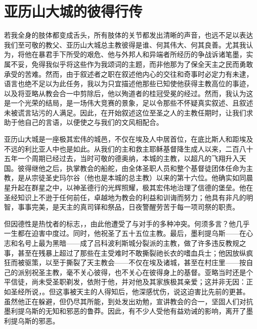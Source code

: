 
\chapter{亚历山大城的彼得行传}


若我全身的肢体都变成舌头，所有肢体的关节都发出清晰的声音，也远不足以表达我们至可敬的教父、亚历山大城总主教彼得是谁、何其伟大、何其良善。尤其我认为，将他在暴君手下所受的艰危、他与外邦人和异端者所经历的争战诉诸笔墨，实属不妥，免得我似乎将这些作为我颂词的主题，而非他那为了保全天主之民而勇敢承受的苦难。然而，由于叙述者之职在叙述他内心的交往和奇事时必定力有未逮，语言也绝不足以为此任务，我以为只宜描述他那些已知使他获得主教高位的事迹，以及将亚略从教会合一中剪除后，他以殉道者的桂冠受冕的经过。然而，我认为这是一个光荣的结局，是一场伟大竞赛的景象，足以令那些不怀疑真实叙述、且叙述未被谎言玷污的人满足。因此，在开始叙述这位至圣之人的主教任期时，让我们求助于他自己的言语，以便使之与我们的文风相配合。\par

亚历山大城是一座极其宏伟的城邑，不仅在埃及人中居首位，在底比斯人和距埃及不远的利比亚人中也是如此。从我们的主和救主耶稣基督降生成人以来，二百八十五年一个周期已经过去，当时可敬的德奥纳，本城的主教，以超凡的飞翔升入天国。彼得继他之后，执掌教会的船舵，由全体圣职人员和整个基督徒团体任命为主教，是从宗徒圣史玛尔谷（他也是本城的总主教）以来的第十六位。他确实如同晨星升起在群星之中，以神圣德行的光辉照耀，极其宏伟地治理了信德的堡垒。他在圣经知识上不逊于任何前任，卓越地为教会的利益和训诲而努力；他具有非凡的明智，事事完美，是天主的真司铎和祭品，日夜警醒劳苦于每一项司祭的职责。\par

但因德性是热忱者的标志，，由此他遭受了与对手的多种冲突。何须多言？他几乎一生都在迫害中度过。同时，他祝圣了五十五位主教。最后，墨利提乌斯——在心志和名号上最为黑暗——成了吕科波利斯城分裂派的主教，做了许多违反教规之事，甚至在残暴上超过了那些在主受难时不敢撕裂祂长衣的嗜血兵士；他因放纵疯狂而被驱策，以至于撕裂了天主教会——不仅在埃及诸城，甚至在村庄里——按自己的派别祝圣主教，毫不关心彼得，也不关心在彼得身上的基督。亚略当时还是个平信徒，尚未受圣职剃发，依附于他，并对他及其家族极其亲爱；这并非无因：正如圣经所说，。但这事被天主的人得知后，他深感忧伤，说这迫害比先前的更甚。虽然他正在躲避，但仍尽其所能，到处发出劝勉，宣讲教会的合一，坚固人们对抗墨利提乌斯的无知和邪恶的鲁莽。因此，有不少人受他有益劝诫的影响，离开了墨利提乌斯的邪恶。\par

